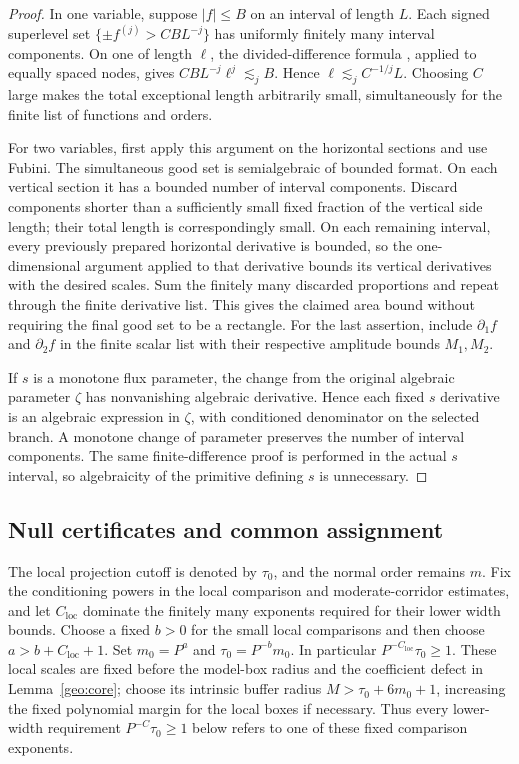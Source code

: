 \documentclass[11pt]{amsart}
\theoremstyle{definition}
\theoremstyle{remark}
\numberwithin{equation}{section}
\begin{document}
\begin{proof}
In one variable, suppose $|f|\le B$ on an interval of length $L$. Each signed superlevel set $\{\pm f^{(j)}>CBL^{-j}\}$ has uniformly finitely many interval components. On one of length $\ell$, the divided-difference formula \cite[equations (44) and (52)]{deBoor}, applied to equally spaced nodes, gives $CBL^{-j}\ell^j\lesssim_j B$. Hence $\ell\lesssim_j C^{-1/j}L$. Choosing $C$ large makes the total exceptional length arbitrarily small, simultaneously for the finite list of functions and orders.

For two variables, first apply this argument on the horizontal sections and use Fubini. The simultaneous good set is semialgebraic of bounded format. On each vertical section it has a bounded number of interval components. Discard components shorter than a sufficiently small fixed fraction of the vertical side length; their total length is correspondingly small. On each remaining interval, every previously prepared horizontal derivative is bounded, so the one-dimensional argument applied to that derivative bounds its vertical derivatives with the desired scales. Sum the finitely many discarded proportions and repeat through the finite derivative list. This gives the claimed area bound without requiring the final good set to be a rectangle. For the last assertion, include $\partial_1f$ and $\partial_2f$ in the finite scalar list with their respective amplitude bounds $M_1,M_2$.

If $s$ is a monotone flux parameter, the change from the original algebraic parameter $\zeta$ has nonvanishing algebraic derivative. Hence each fixed $s$ derivative is an algebraic expression in $\zeta$, with conditioned denominator on the selected branch. A monotone change of parameter preserves the number of interval components. The same finite-difference proof is performed in the actual $s$ interval, so algebraicity of the primitive defining $s$ is unnecessary.
\end{proof}

\subsection{Null certificates and common assignment}\label{geo:common-assignment}\label{geo:null-subsection}

The local projection cutoff is denoted by $\tau_0$, and the normal order remains $m$. Fix the conditioning powers in the local comparison and moderate-corridor estimates, and let $C_{\mathrm{loc}}$ dominate the finitely many exponents required for their lower width bounds. Choose a fixed $b>0$ for the small local comparisons and then choose $a>b+C_{\mathrm{loc}}+1$. Set $m_0=P^a$ and $\tau_0=P^{-b}m_0$. In particular $P^{-C_{\mathrm{loc}}}\tau_0\ge1$. These local scales are fixed before the model-box radius and the coefficient defect in Lemma~\ref{geo:core}; choose its intrinsic buffer radius $M>\tau_0+6m_0+1$, increasing the fixed polynomial margin for the local boxes if necessary. Thus every lower-width requirement $P^{-C}\tau_0\ge1$ below refers to one of these fixed comparison exponents.
\end{document}
